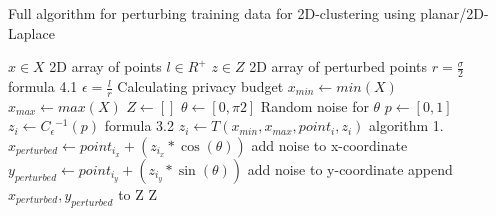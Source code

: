 \begin{algorithm}[H]
  \caption{Full algorithm for perturbing training data for 2D-clustering using planar/2D-Laplace \citep{DBLP:journals/corr/abs-1212-1984}}\label{alg:rq1}
  \begin{algorithmic}
    \Require $x \in X$  \Comment 2D array of points
    \Require $l \in R^ +$
    \Ensure $z \in Z$ \Comment 2D array of perturbed points
    \State $r = \frac{\sigma}{2}$ \Comment formula 4.1
    \State $\epsilon = \frac{l}{r}$ \Comment Calculating privacy budget \citep{DBLP:journals/corr/abs-1212-1984}
    \State $x_{min} \gets min(X)$
    \State $x_{max} \gets max(X)$
    \State $Z \gets []$
    \State $\theta \gets [0, \pi2]$       \Comment Random noise for $\theta$
    \State $p \gets [0, 1]$
    \State $z_i \gets C{_\epsilon}{^{-1}}(p)$       \Comment formula 3.2
    \State $z_i \gets T(x_{min}, x_{max}, point_i, z_i)$ \Comment algorithm 1.
    \State $x_{perturbed} \gets point_{i_x} + (z_{i_x} * \cos(\theta)) $ \Comment add noise to x-coordinate
    \State $y_{perturbed} \gets point_{i_y} + (z_{i_y} * \sin(\theta)) $ \Comment add noise to y-coordinate
    \State append $x_{perturbed}, y_{perturbed}$ to Z
    \EndFor
    \State \Return Z
  \end{algorithmic}
  \label{alg:2d-laplace}
\end{algorithm}
